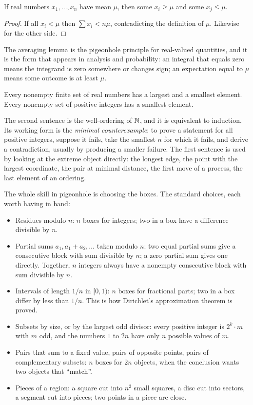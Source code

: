\begin{lemma}[Averaging]
If real numbers $x_1, \dots, x_n$ have mean $\mu$, then some $x_i \ge \mu$ and some $x_j \le \mu$.
\end{lemma}

\begin{proof}
If all $x_i < \mu$ then $\sum x_i < n\mu$, contradicting the definition of $\mu$. Likewise for the other side.
\end{proof}

The averaging lemma is the pigeonhole principle for real-valued quantities, and it is the form that appears in analysis and probability: an integral that equals zero means the integrand is zero somewhere or changes sign; an expectation equal to $\mu$ means some outcome is at least $\mu$.

\begin{theorem}
Every nonempty finite set of real numbers has a largest and a smallest element. Every nonempty set of positive integers has a smallest element.
\end{theorem}

The second sentence is the well-ordering of $\mathbb{N}$, and it is equivalent to induction. Its working form is the \emph{minimal counterexample}: to prove a statement for all positive integers, suppose it fails, take the smallest $n$ for which it fails, and derive a contradiction, usually by producing a smaller failure. The first sentence is used by looking at the extreme object directly: the longest edge, the point with the largest coordinate, the pair at minimal distance, the first move of a process, the last element of an ordering.

The whole skill in pigeonhole is choosing the boxes. The standard choices, each worth having in hand:

\begin{itemize}[nosep,leftmargin=*]
\item Residues modulo $n$: $n$ boxes for integers; two in a box have a difference divisible by $n$.
\item Partial sums $a_1, a_1 + a_2, \dots$ taken modulo $n$: two equal partial sums give a consecutive block with sum divisible by $n$; a zero partial sum gives one directly. Together, $n$ integers always have a nonempty consecutive block with sum divisible by $n$.
\item Intervals of length $1/n$ in $[0, 1)$: $n$ boxes for fractional parts; two in a box differ by less than $1/n$. This is how Dirichlet's approximation theorem is proved.
\item Subsets by size, or by the largest odd divisor: every positive integer is $2^k \cdot m$ with $m$ odd, and the numbers $1$ to $2n$ have only $n$ possible values of $m$.
\item Pairs that sum to a fixed value, pairs of opposite points, pairs of complementary subsets: $n$ boxes for $2n$ objects, when the conclusion wants two objects that ``match''.
\item Pieces of a region: a square cut into $n^2$ small squares, a disc cut into sectors, a segment cut into pieces; two points in a piece are close.
\end{itemize}

